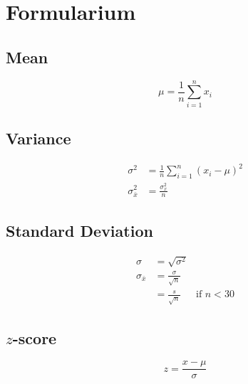 \documentclass[a4paper]{article}
\begin{document}
\twocolumn

\section{Formularium}

\subsection{Mean}

\begin{equation}
\mu = \frac{1}{n}\sum_{i=1}^n x_i
\end{equation}

\subsection{Variance}

\begin{align}
\sigma^2 &=\frac 1n \sum_{i=1}^n (x_i - \mu)^2 \\
\sigma_{\bar{x}}^2 &= \frac{\sigma_{x}^2}{n} 
\end{align}

\subsection{Standard Deviation}
\begin{align}
\sigma &= \sqrt{\sigma^2} \\
\sigma_{\bar{x}}  &= \frac{\sigma}{\sqrt{n}}  & \\
                  &= \frac{s}{\sqrt{n}}       &\text{if $n < 30$}
\end{align}

% 

\subsection{$z$-score}

\begin{equation}
z = \frac{x- \mu}{\sigma}
\end{equation}
\end{document}
